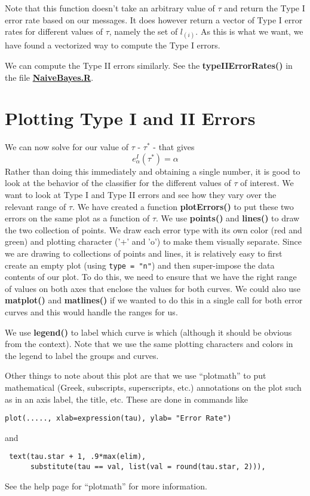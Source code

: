 \documentclass{article}
\def\SFunction#1{\textbf{#1()}}
\def\Sexpression#1{\texttt{#1}}
\def\file#1{\HREF{http://winnie.ucdavis.edu/stat141/Winter04/Homework/NaieveBayes/Solutions/#1}{\textbf{#1}}}
\def\HREF#1#2{\href{#1}{#2}}
\begin{document}
Note that this function doesn't take an arbitrary value of $\tau$ and
return the Type I error rate based on our messages.  It does however
return a vector of Type I error rates for different values of $\tau$,
namely the set of $l_{(i)}$.  As this is what we want, we have found a
vectorized way to compute the Type I errors.

We can compute the Type II errors similarly.  See the
\SFunction{typeIIErrorRates} in the file
\file{NaiveBayes.R}.



\section{Plotting Type I and II Errors}

We can now solve for our value of
$\tau$  - $\tau^\ast$ - that gives
$$e^I_\alpha(\tau^\ast) = \alpha$$ Rather than doing this immediately
and obtaining a single number, it is good to look at the behavior of
the classifier for the different values of $\tau$ of interest.  We
want to look at Type I and Type II errors and see how they vary over
the relevant range of $\tau$.  We have created a function
\SFunction{plotErrors} to put these two errors on the same plot as a
function of $\tau$.  We use \SFunction{points} and \SFunction{lines}
to draw the two collection of points.  We draw each error type with
its own color (red and green) and plotting character ('+' and 'o') to
make them visually separate.  Since we are drawing to collections of
points and lines, it is relatively easy to first create an empty plot
(using \Sexpression{type = "n"}) and then super-impose the data
contents of our plot.  To do this, we need to ensure that we have the
right range of values on both axes that enclose the values for both
curves.  We could also use \SFunction{matplot} and
\SFunction{matlines} if we wanted to do this in a single call for both
error curves and this would handle the ranges for us.


We use \SFunction{legend} to label which curve is which (although it
should be obvious from the context).  Note that we use the same
plotting characters and colors in the legend to label the groups and
curves.

Other things to note about this plot are that we use ``plotmath'' to
put mathematical (Greek, subscripts, superscripts, etc.)  annotations
on the plot such as in an axis label, the title, etc.
These are done in commands like
\begin{verbatim}
plot(....., xlab=expression(tau), ylab= "Error Rate")
\end{verbatim}
and
\begin{verbatim}
 text(tau.star + 1, .9*max(elim),
      substitute(tau == val, list(val = round(tau.star, 2))),
\end{verbatim}
See the help page for ``plotmath'' for more information.
\end{document}
